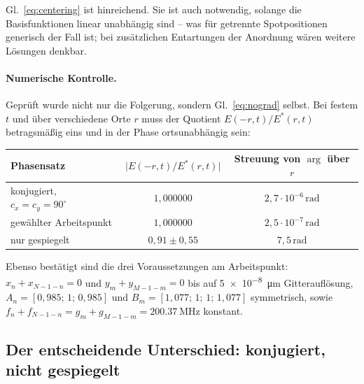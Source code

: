 \documentclass[11pt,a4paper]{article}
\begin{document}
Gl.~\eqref{eq:centering} ist hinreichend. Sie ist auch notwendig, solange die
Basisfunktionen linear unabhängig sind -- was für getrennte Spotpositionen
generisch der Fall ist; bei zusätzlichen Entartungen der Anordnung wären
weitere Lösungen denkbar.

\paragraph{Numerische Kontrolle.}
Geprüft wurde nicht nur die Folgerung, sondern Gl.~\eqref{eq:nograd} selbst.
Bei festem $t$ und über verschiedene Orte $r$ muss der Quotient
$E(-r,t)/E^{*}(r,t)$ betragsmäßig eins und in der Phase ortsunabhängig sein:

\begin{center}
\begin{tabular}{lcc}
  \toprule
  Phasensatz & $\bigl|E(-r,t)/E^{*}(r,t)\bigr|$ & Streuung von $\arg$ über $r$\\
  \midrule
  konjugiert, $c_x=c_y=90^\circ$ & $1{,}000000$ & $2{,}7\cdot10^{-6}\,\mathrm{rad}$\\
  gewählter Arbeitspunkt         & $1{,}000000$ & $2{,}5\cdot10^{-7}\,\mathrm{rad}$\\
  nur gespiegelt                 & $0{,}91 \pm 0{,}55$ & $7{,}5\,\mathrm{rad}$\\
  \bottomrule
\end{tabular}
\end{center}

Ebenso bestätigt sind die drei Voraussetzungen am Arbeitspunkt:
$x_n+x_{N-1-n}=0$ und $y_m+y_{M-1-m}=0$ bis auf
\SI{5e-8}{\micro\meter} Gitterauflösung, $A_n=[0{,}985;\,1;\,0{,}985]$ und
$B_m=[1{,}077;\,1;\,1;\,1{,}077]$ symmetrisch, sowie
$f_n+f_{N-1-n} = g_m+g_{M-1-m} = \SI{200.37}{\mega\hertz}$ konstant.

\subsection{Der entscheidende Unterschied: konjugiert, nicht gespiegelt}
\end{document}
